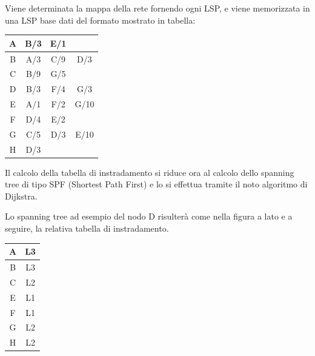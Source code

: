             Viene determinata la mappa della rete fornendo ogni LSP, e viene memorizzata in una LSP base dati del formato mostrato in tabella:

            \begin{table}[h]
                \centering
                \begin{tabular}{|c|c|c|c|}
                \hline
                A & B/3 & E/1 &  \\ \hline
                B & A/3 & C/9 & D/3 \\ \hline
                C & B/9 & G/5 &  \\ \hline
                D & B/3 & F/4 & G/3 \\ \hline
                E & A/1 & F/2 & G/10 \\ \hline
                F & D/4 & E/2 &  \\ \hline
                G & C/5 & D/3 & E/10 \\ \hline
                H & D/3 &  &  \\ \hline
                \end{tabular}
            \end{table}

            Il calcolo della tabella di instradamento si riduce ora al calcolo dello spanning tree di tipo SPF (Shortest Path First) e lo si effettua tramite il noto algoritmo di Dijkstra.

            Lo spanning tree ad esempio del nodo D risulterà come nella figura a lato e a seguire, la relativa tabella di instradamento.

            

            \begin{table}[h]
                \centering
                \begin{tabular}{|c|c|}
                \hline
                A & L3 \\ \hline
                B & L3 \\ \hline
                C & L2 \\ \hline
                E & L1 \\ \hline
                F & L1 \\ \hline
                G & L2 \\ \hline
                H & L2 \\ \hline
                \end{tabular}
            \end{table}

